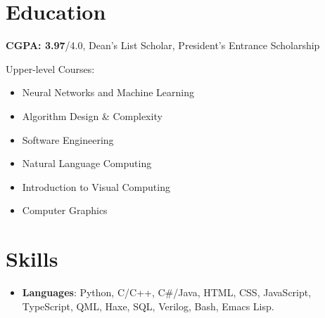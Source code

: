 {    \section{Education}
    \begin{itemize}
        \setlength\itemsep{0pt}
        \item \textbf{CGPA: 3.97}/4.0, Dean's List Scholar, President's Entrance Scholarship
        {
        \footnotesize
        \item  Upper-level Courses:
        \setlength\multicolsep{0pt}
        \begin{multicols}{3}
        \begin{itemize} \setlength\itemsep{0pt}
            \item Neural Networks and Machine Learning
            \item Algorithm Design \& Complexity
            \item Software Engineering
            \item Natural Language Computing
            \item Introduction to Visual Computing
            \item Computer Graphics
        \end{itemize}
        \end{multicols}
        }
    \end{itemize}

    \section{Skills}
    {
    \begin{itemize} \setlength\itemsep{0pt}
    \item
        \textbf{Languages}:
        Python,
        C/C++,
        C\#/Java,
        HTML,
        CSS,
        JavaScript,
        TypeScript,
        QML,
        Haxe,
        SQL,
        Verilog,
        Bash,
        Emacs Lisp.


\end{itemize}}}
